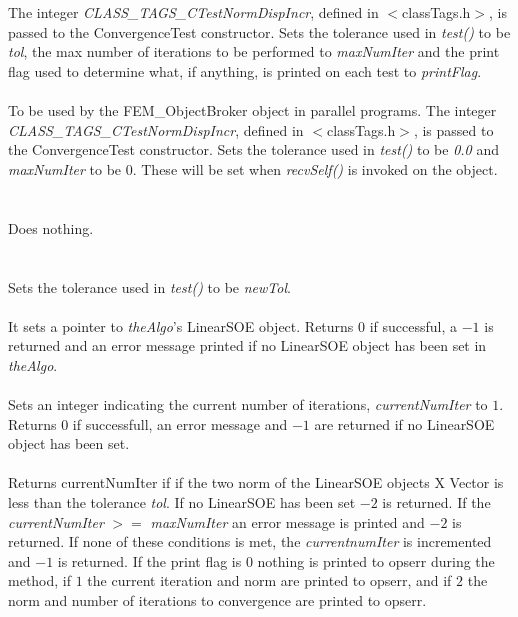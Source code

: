   \\
  \\
The integer {\em CLASS\_TAGS\_CTestNormDispIncr}, defined in
$<$classTags.h$>$, is passed to the ConvergenceTest constructor. Sets
the tolerance used in {\em test()} to be {\em tol}, the max number
of iterations to be performed to {\em maxNumIter} and the print
flag used to determine what, if anything, is printed on each test to
{\em printFlag}. \\


  \\
To be used by the FEM\_ObjectBroker object in parallel programs. The
integer {\em CLASS\_TAGS\_CTestNormDispIncr}, defined in
$<$classTags.h$>$, is passed to the ConvergenceTest constructor. Sets
the tolerance used in {\em test()} to be {\em 0.0} and {\em maxNumIter} 
to be $0$. These will be set when {\em recvSelf()} is invoked on the object. \\


 \\
 \\ 
Does nothing. \\

  \\
 \\
Sets the tolerance used in {\em test()} to be {\em newTol}. \\

 \\
It sets a pointer to {\em theAlgo}'s LinearSOE object. Returns $0$ if
successful, a $-1$ is returned and an error message printed if no
LinearSOE object has been set in {\em theAlgo}. \\

 \\
Sets an integer indicating the current number of iterations, {\em
currentNumIter} to $1$. Returns $0$ if successfull, an error message
and $-1$ are returned if no LinearSOE object has been set. \\

 \\
Returns {currentNumIter} if if the two norm of the LinearSOE objects X
Vector is less than the tolerance {\em tol}. If no LinearSOE has been
set $-2$ is returned. If the {\em currentNumIter} $>=$ {\em
maxNumIter} an error message is printed and $-2$ is returned. If none
of these conditions is met, the {\em currentnumIter} is incremented
and $-1$ is returned. If the print flag is $0$ nothing is printed to
opserr during the method, if $1$ the current iteration and norm are
printed to opserr, and if $2$ the norm and number of iterations to convergence
are printed to opserr. \\ 


